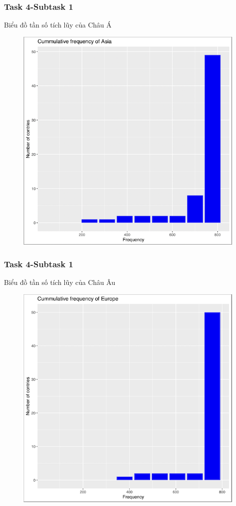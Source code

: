 \documentclass[english,10pt,table]{beamer}
\begin{document}
\frame
{
    \frametitle{Task 4-Subtask 1}
    \begin{block}{Biểu đồ tần số tích lũy của Châu Á}
    \begin{figure}
        \centering
        \includegraphics[scale=0.6]{images/4.1.2.png}
    \end{figure}
    \end{block}
}
\frame
{
    \frametitle{Task 4-Subtask 1}
    \begin{block}{Biểu đồ tần số tích lũy của Châu Âu}
    \begin{figure}
        \centering
        \includegraphics[scale=0.6]{images/4.1.3.png}
    \end{figure}
    \end{block}
}
\end{document}
